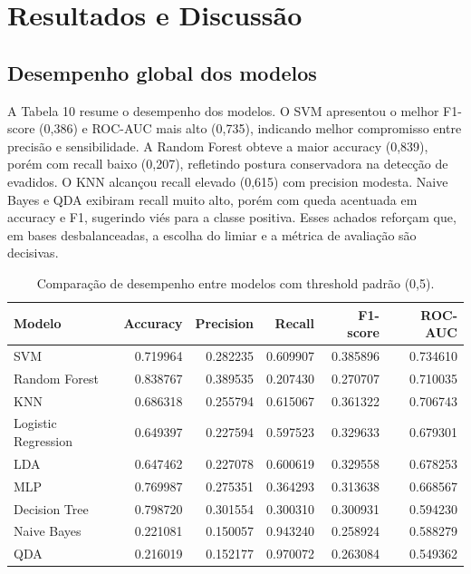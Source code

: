 \documentclass[english, spanish, brazilian]{RBIEarticle} %
\begin{document}
\newpage
\section{Resultados e Discussão}

\subsection{Desempenho global dos modelos}

A Tabela 10 resume o desempenho dos modelos. O SVM apresentou o melhor F1-score (0,386) e ROC-AUC mais alto (0,735), indicando melhor compromisso entre precisão e sensibilidade. A Random Forest obteve a maior accuracy (0,839), porém com recall baixo (0,207), refletindo postura conservadora na detecção de evadidos. O KNN alcançou recall elevado (0,615) com precision modesta. Naive Bayes e QDA exibiram recall muito alto, porém com queda acentuada em accuracy e F1, sugerindo viés para a classe positiva. Esses achados reforçam que, em bases desbalanceadas, a escolha do limiar e a métrica de avaliação são decisivas.

\begin{table}[H]
	\centering
	\caption{Comparação de desempenho entre modelos com threshold padrão (0,5).}
	\label{tab:comparacao-global}
	\begin{tabular}{lrrrrr}
	\toprule
	M\textbf{odelo} & \textbf{Accuracy} & \textbf{Precision} & \textbf{Recall} & \textbf{F1-score} & \textbf{ROC-AUC} \\
	\midrule
	SVM                  & 0.719964 & 0.282235 & 0.609907 & 0.385896 & 0.734610 \\
	Random Forest        & 0.838767 & 0.389535 & 0.207430 & 0.270707 & 0.710035 \\
	KNN                  & 0.686318 & 0.255794 & 0.615067 & 0.361322 & 0.706743 \\
	Logistic Regression  & 0.649397 & 0.227594 & 0.597523 & 0.329633 & 0.679301 \\
	LDA                  & 0.647462 & 0.227078 & 0.600619 & 0.329558 & 0.678253 \\
	MLP                  & 0.769987 & 0.275351 & 0.364293 & 0.313638 & 0.668567 \\
	Decision Tree        & 0.798720 & 0.301554 & 0.300310 & 0.300931 & 0.594230 \\
	Naive Bayes          & 0.221081 & 0.150057 & 0.943240 & 0.258924 & 0.588279 \\
	QDA                  & 0.216019 & 0.152177 & 0.970072 & 0.263084 & 0.549362 \\
	\bottomrule
	\end{tabular}
\end{table}
\end{document}

